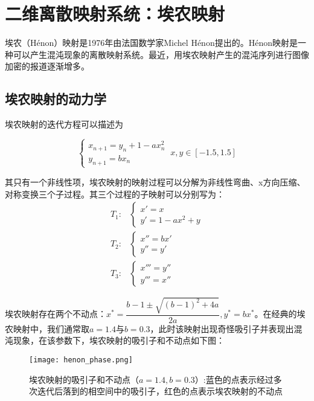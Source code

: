 \section{二维离散映射系统：埃农映射}
埃农（H\'{e}non）映射是1976年由法国数学家Michel H\'{e}non提出的。H\'{e}non映射是一种可以产生混沌现象的离散映射系统。最近，用埃农映射产生的混沌序列进行图像加密的报道逐渐增多。
\subsection{埃农映射的动力学}

埃农映射的迭代方程可以描述为

\begin{equation}
    \begin{cases}
        x_{n+1}=y_n+1-ax_n^2\\
        y_{n+1}=bx_n
    \end{cases}\ x,y\in [-1.5,1.5]
\end{equation}

其只有一个非线性项，埃农映射的映射过程可以分解为非线性弯曲、x方向压缩、对称变换三个子过程。其三个过程的子映射可以分别写为：
\begin{equation}
    \begin{aligned}
        T_1: & \begin{cases}
            x'=x\\
            y'=1-ax^2+y
        \end{cases}\\
        T_2: & \begin{cases}
            x''=bx'\\
            y''=y'
        \end{cases}\\
        T_3: & \begin{cases}
            x'''=y''\\
            y'''=x''
        \end{cases}
    \end{aligned}
\end{equation}

埃农映射存在两个不动点：$x^*=\dfrac{b-1\pm\sqrt{(b-1)^2+4a}}{2a},y^*=bx^*$。在经典的埃农映射中，我们通常取$a=1.4$与$b=0.3$，此时该映射出现奇怪吸引子并表现出混沌现象，在该参数下，埃农映射的吸引子和不动点如下图：
\begin{figure}
	\centering
	\texttt{[image: henon\_phase.png]}
    \caption[埃农映射的吸引子和不动点]{埃农映射的吸引子和不动点（$a=1.4,b=0.3$）:蓝色的点表示经过多次迭代后落到的相空间中的吸引子，红色的点表示埃农映射的不动点}
    \label{fig:logi_lypn}
\end{figure}

